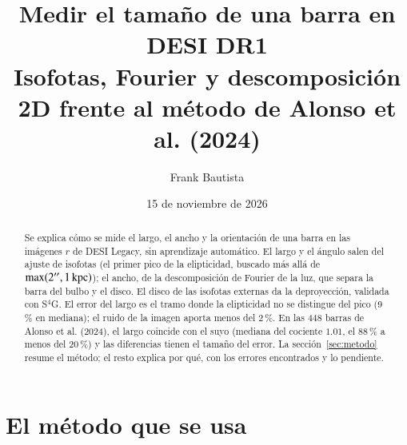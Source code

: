 \documentclass[11pt,a4paper]{article}
\title{Medir el tamaño de una barra en DESI DR1\\[2pt]
\large Isofotas, Fourier y descomposición 2D frente al método de Alonso et al. (2024)}
\author{Frank Bautista}
\date{15 de noviembre de 2026}
\newcommand{\as}{\ensuremath{^{\prime\prime}}}
\begin{document}
\maketitle

\begin{abstract}
Se explica cómo se mide el largo, el ancho y la orientación de una barra en las imágenes $r$ de DESI Legacy, sin
aprendizaje automático. El largo y el ángulo salen del ajuste de isofotas (el primer pico de la elipticidad,
buscado más allá de $\max(2\as, 1\,{\rm kpc})$); el ancho, de la descomposición de Fourier de la luz, que separa
la barra del bulbo y el disco. El disco de las isofotas externas da la deproyección, validada con S$^4$G. El error
del largo es el tramo donde la elipticidad no se distingue del pico (9\,\% en mediana); el ruido de la imagen
aporta menos del 2\,\%. En las 448 barras de Alonso et al. (2024), el largo coincide con el suyo (mediana del
cociente $1.01$, el 88\,\% a menos del 20\,\%) y las diferencias tienen el tamaño del error. La
sección~\ref{sec:metodo} resume el método; el resto explica por qué, con los errores encontrados y lo pendiente.
\end{abstract}

\tableofcontents


\section{El método que se usa}\label{sec:metodo}
\end{document}
